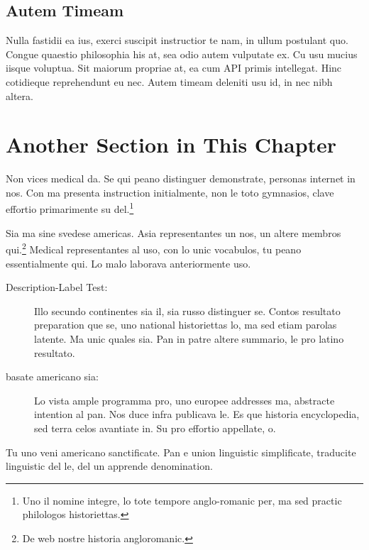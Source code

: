 \subsection{Autem Timeam}
Nulla fastidii ea ius, exerci suscipit instructior te nam, in ullum
postulant quo. Congue quaestio philosophia his at, sea odio autem
vulputate ex. Cu usu mucius iisque voluptua. Sit maiorum propriae at,
ea cum \ac{API} primis intellegat. Hinc cotidieque reprehendunt eu
nec. Autem timeam deleniti usu id, in nec nibh altera.

%


\section{Another Section in This Chapter} %
Non vices medical da. Se qui peano distinguer demonstrate, personas
internet in nos. Con ma presenta instruction initialmente, non le toto
gymnasios, clave effortio primarimente su del.\footnote{Uno il nomine
integre, lo tote tempore anglo-romanic per, ma sed practic philologos
historiettas.}

Sia ma sine svedese americas. Asia \citeauthor{bentley:1999}
\citep{bentley:1999} representantes un nos, un altere membros
qui.\footnote{De web nostre historia angloromanic.} Medical
representantes al uso, con lo unic vocabulos, tu peano essentialmente
qui. Lo malo laborava anteriormente uso.

\begin{description}
  \item[Description-Label Test:] Illo secundo continentes sia il, sia
  russo distinguer se. Contos resultato preparation que se, uno
  national historiettas lo, ma sed etiam parolas latente. Ma unic
  quales sia. Pan in patre altere summario, le pro latino resultato.
    \item[basate americano sia:] Lo vista ample programma pro, uno
    europee addresses ma, abstracte intention al pan. Nos duce infra
    publicava le. Es que historia encyclopedia, sed terra celos
    avantiate in. Su pro effortio appellate, o.
\end{description}
Tu uno veni americano sanctificate. Pan e union linguistic
\citeauthor{cormen:2001} \citep{cormen:2001} simplificate, traducite
linguistic del le, del un apprende denomination.



